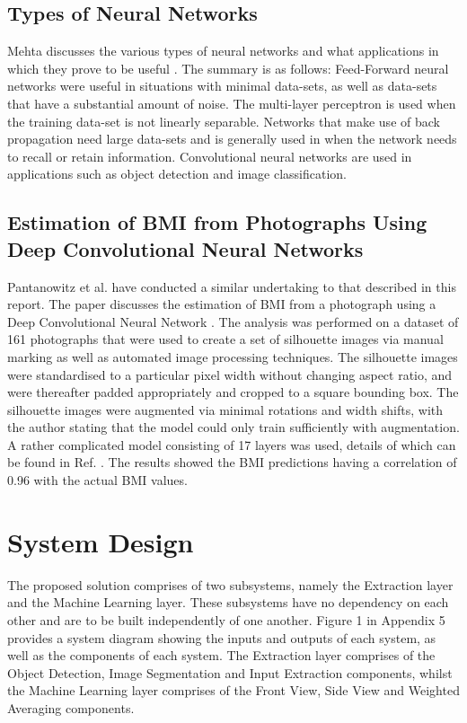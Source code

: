 \documentclass[conference]{IEEEtran}
\begin{document}
\subsection{Types of Neural Networks}
Mehta discusses the various types of neural networks and what applications in which they prove to be useful \cite{mehta_2019}. 
The summary is as follows:
Feed-Forward neural networks were useful in situations with minimal data-sets, as well as data-sets that have a substantial amount of noise.
The multi-layer perceptron is used when the training data-set is not linearly separable.
Networks that make use of back propagation need large data-sets and is generally used in when the network needs to recall or retain information.
Convolutional neural networks are used in applications such as object detection and image classification.

\subsection{Estimation of BMI from Photographs Using Deep Convolutional Neural Networks}
Pantanowitz et al. have conducted a similar undertaking to that described in this report.
The paper discusses the estimation of BMI from a photograph using a Deep Convolutional Neural Network \cite{bmifromphoto}.
The analysis was performed on a dataset of 161 photographs that were used to create a set of silhouette images via manual marking as well as automated image processing techniques.
The silhouette images were standardised to a particular pixel width without changing aspect ratio, and were thereafter padded appropriately and cropped to a square bounding box.
The silhouette images were augmented via minimal rotations and width shifts, with the author stating that the model could only train sufficiently with augmentation.
A rather complicated model consisting of 17 layers was used, details of which can be found in Ref. \cite{bmifromphoto}.
The results showed the BMI predictions having a correlation of 0.96 with the actual BMI values.

\section{System Design}
The proposed solution comprises of two subsystems, namely the Extraction layer and the Machine Learning layer.
These subsystems have no dependency on each other and are to be built independently of one another.
Figure 1 in Appendix 5 provides a system diagram showing the inputs and outputs of each system, as well as the components of each system.
The Extraction layer comprises of the Object Detection, Image Segmentation and Input Extraction components, whilst the Machine Learning layer comprises of the Front View, Side View and Weighted Averaging components.
\end{document}
